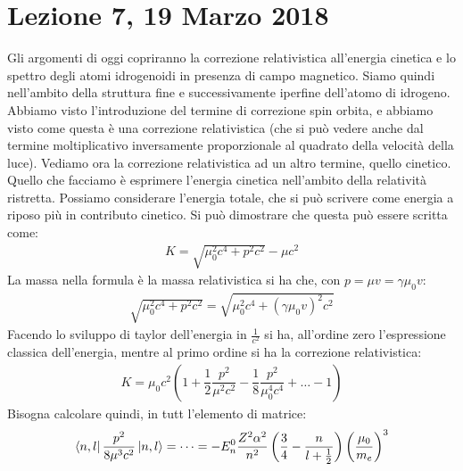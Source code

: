 \documentclass[../AppuntiStruttura]{subfiles}
\begin{document}
	\section*{Lezione 7, 19 Marzo 2018}
	Gli argomenti di oggi copriranno la correzione relativistica all'energia cinetica e lo spettro degli atomi idrogenoidi in presenza di campo magnetico. Siamo quindi nell'ambito della struttura fine e successivamente iperfine dell'atomo di idrogeno. Abbiamo visto l'introduzione del termine di correzione spin orbita, e abbiamo visto come questa è una correzione relativistica (che si può vedere anche dal termine moltiplicativo inversamente proporzionale al quadrato della velocità della luce). Vediamo ora la correzione relativistica ad un altro termine, quello cinetico. Quello che facciamo è esprimere l'energia cinetica nell'ambito della relatività ristretta. Possiamo considerare l'energia totale, che si può scrivere come energia a riposo più in contributo cinetico. Si può dimostrare che questa può essere scritta come:
	\begin{gather}
		K=\sqrt{\mu_{0}^{2}c^{4}+p^{2}c^{2}}-\mu c^{2}
	\end{gather}
	La massa nella formula è la massa relativistica si ha che, con $ p=\mu v=\gamma\mu_{0}v $:
	\begin{gather}
		\sqrt{\mu_{0}^{2}c^{4}+p^{2}c^{2}}=\sqrt{\mu_{0}^{2}c^{4}+\left(\gamma\mu_{0}v\right)^{2}c^{2}}
	\end{gather}
	Facendo lo sviluppo di taylor dell'energia in $ \frac{1}{c^{2}} $ si ha, all'ordine zero l'espressione classica dell'energia, mentre al primo ordine si ha la correzione relativistica:
	\begin{gather}
		K=\mu_{0}c^{2}\left(1+\dfrac{1}{2}\dfrac{p^{2}}{\mu^{2}c^{2}}-\dfrac{1}{8}\dfrac{p^{2}}{\mu_{0}^{4}c^{4}}+\dots-1\right)
	\end{gather}
	Bisogna calcolare quindi, in tutt l'elemento di matrice:
	\begin{gather}
	\bra{n,l}\dfrac{p^{2}}{8\mu^{3}c^{2}}\ket{n,l}=\dots=-E_{n}^{0}\dfrac{Z^{2}\alpha^{2}}{n^{2}}\left(\dfrac{3}{4}-\dfrac{n}{l+\frac{1}{2}}\right)\left(\dfrac{\mu_{0}}{m_{e}}\right)^{3}
	\end{gather}
\end{document}
